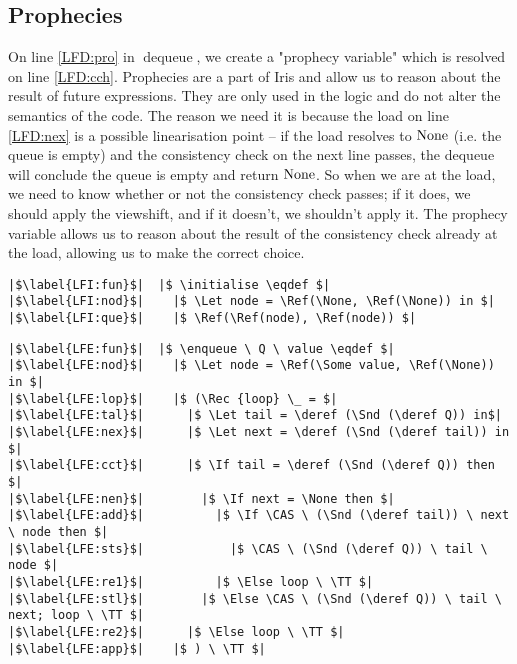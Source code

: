 \documentclass[a4paper, 11pt]{report}
\newcommand{\initialise}{\operatorname{initialize}}
\newcommand{\enqueue}{\operatorname{enqueue}}
\newcommand{\dequeue}{\operatorname{dequeue}}
\begin{document}
\subsection{Prophecies}
On line \ref{LFD:pro} in $\dequeue$, we create a "prophecy variable" which is resolved on line \ref{LFD:cch}. Prophecies are a part of Iris and allow us to reason about the result of future expressions. They are only used in the logic and do not alter the semantics of the code. The reason we need it is because the load on line \ref{LFD:nex} is a possible linearisation point -- if the load resolves to $\operatorname{None}$ (i.e. the queue is empty) and the consistency check on the next line passes, the dequeue will conclude the queue is empty and return $\operatorname{None}$. So when we are at the load, we need to know whether or not the consistency check passes; if it does, we should apply the viewshift, and if it doesn't, we shouldn't apply it. The prophecy variable allows us to reason about the result of the consistency check already at the load, allowing us to make the correct choice.

\begin{verbatim}
|$\label{LFI:fun}$|  |$ \initialise \eqdef $|
|$\label{LFI:nod}$|    |$ \Let node = \Ref(\None, \Ref(\None)) in $|
|$\label{LFI:que}$|    |$ \Ref(\Ref(node), \Ref(node)) $|
\end{verbatim}

\begin{verbatim}
|$\label{LFE:fun}$|  |$ \enqueue \ Q \ value \eqdef $|
|$\label{LFE:nod}$|    |$ \Let node = \Ref(\Some value, \Ref(\None)) in $|
|$\label{LFE:lop}$|    |$ (\Rec {loop} \_ = $|
|$\label{LFE:tal}$|      |$ \Let tail = \deref (\Snd (\deref Q)) in$|
|$\label{LFE:nex}$|      |$ \Let next = \deref (\Snd (\deref tail)) in $|
|$\label{LFE:cct}$|      |$ \If tail = \deref (\Snd (\deref Q)) then $|
|$\label{LFE:nen}$|        |$ \If next = \None then $|
|$\label{LFE:add}$|          |$ \If \CAS \ (\Snd (\deref tail)) \ next \ node then $|
|$\label{LFE:sts}$|            |$ \CAS \ (\Snd (\deref Q)) \ tail \ node $|
|$\label{LFE:re1}$|          |$ \Else loop \ \TT $|
|$\label{LFE:stl}$|        |$ \Else \CAS \ (\Snd (\deref Q)) \ tail \ next; loop \ \TT $|
|$\label{LFE:re2}$|      |$ \Else loop \ \TT $|
|$\label{LFE:app}$|    |$ ) \ \TT $|
\end{verbatim}
\end{document}
